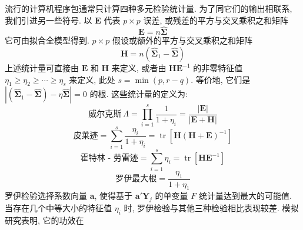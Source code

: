 流行的计算机程序包通常只计算四种多元检验统计量. 为了同它们的输出相联系, 我们引进另一些符号. 以 $\mathbf{E}$ 代表 $p\times p$ 误差, 或残差的平方与交叉乘积之和矩阵
\[
\mathbf{E}=n\hat{\boldsymbol{\Sigma}}
\]
它可由拟合全模型得到. $p\times p$ 假设或额外的平方与交叉乘积之和矩阵
\[
\mathbf{H}=n(\hat{\boldsymbol{\Sigma}}_1-\hat{\boldsymbol{\Sigma}})
\]
上述统计量可直接由 $\mathbf{E}$ 和 $\mathbf{H}$ 来定义, 或者由 $\mathbf{H}\mathbf{E}^{-1}$ 的非零特征值 $\eta_1\geqslant\eta_2\geqslant\cdots\geqslant\eta_s$ 来定义, 此处 $s=\min(p,r-q)$. 等价地, 它们是 $|(\hat{\boldsymbol{\Sigma}}_1-\hat{\boldsymbol{\Sigma}})-\eta\hat{\boldsymbol{\Sigma}}|=0$ 的根. 这些统计量的定义为:
\[
\text{威尔克斯}\ \Lambda=\prod_{i=1}^{s}\frac{1}{1+\eta_i}=\frac{|\mathbf{E}|}{|\mathbf{E}+\mathbf{H}|}
\]
\[
\text{皮莱迹}=\sum_{i=1}^{s}\frac{\eta_i}{1+\eta_i}=\operatorname{tr}[\mathbf{H}(\mathbf{H}+\mathbf{E})^{-1}]
\]
\[
\text{霍特林 - 劳雷迹}=\sum_{i=1}^{s}\eta_i=\operatorname{tr}[\mathbf{H}\mathbf{E}^{-1}]
\]
\[
\text{罗伊最大根}=\frac{\eta_1}{1+\eta_1}
\]
罗伊检验选择系数向量 $\mathbf{a}$, 使得基于 $\mathbf{a}'\mathbf{Y}_j$ 的单变量 $F$ 统计量达到最大的可能值. 当存在几个中等大小的特征值 $\eta_i$ 时, 罗伊检验与其他三种检验相比表现较差. 模拟研究表明, 它的功效在
